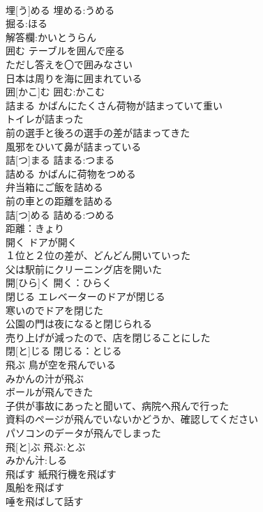 \documentclass[8pt]{extreport}
\begin{document}
\begin{CJK}{UTF8}{min}
\\	埋[う]める			埋める:うめる
\\	掘る:ほる
\\	解答欄:かいとうらん
\\	囲む	テーブルを囲んで座る 
\\	ただし答えを〇で囲みなさい 
\\	日本は周りを海に囲まれている 
\\	囲[かこ]む			囲む:かこむ
\\	詰まる	かばんにたくさん荷物が詰まっていて重い 
\\	トイレが詰まった 
\\	前の選手と後ろの選手の差が詰まってきた 
\\	風邪をひいて鼻が詰まっている 
\\	詰[つ]まる			詰まる:つまる
\\	詰める	かばんに荷物をつめる 
\\	弁当箱にご飯を詰める 
\\	前の車との距離を詰める 
\\	詰[つ]める			詰める:つめる
\\	距離：きょり
\\	開く	ドアが開く 
\\	１位と２位の差が、どんどん開いていった 
\\	父は駅前にクリーニング店を開いた 
\\	開[ひら]く			開く：ひらく
\\	閉じる	エレベーターのドアが閉じる 
\\	寒いのでドアを閉じた 
\\	公園の門は夜になると閉じられる 
\\	売り上げが減ったので、店を閉じることにした 
\\	閉[と]じる			閉じる：とじる
\\	飛ぶ	鳥が空を飛んでいる 
\\	みかんの汁が飛ぶ 
\\	ボールが飛んできた 
\\	子供が事故にあったと聞いて、病院へ飛んで行った 
\\	資料のページが飛んでいないかどうか、確認してください 
\\	パソコンのデータが飛んでしまった 
\\	飛[と]ぶ			飛ぶ:とぶ
\\	みかん汁:しる
\\	飛ばす	紙飛行機を飛ばす 
\\	風船を飛ばす 
\\	唾を飛ばして話す 

\end{CJK}
\end{document}
